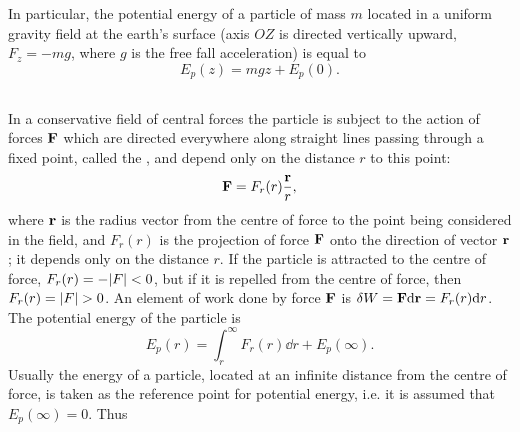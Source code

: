 In particular, the potential energy of a particle of mass $m$ lo­cated in a uniform gravity field at the earth's surface (axis $OZ$ is directed vertically upward, $F_{z} = -mg$, where $g$ is the free fall acceleration) is equal to
\begin{equation*}%
E_{p}(z) = mgz + E_{p}(0).
\end{equation*}

\subsection{}\label{3.3.4}    In a conservative field of central forces the particle is sub­ject to the action of forces $\vb{F}$ which are directed everywhere along straight lines passing through a fixed point, called the , and depend only on the distance $r$ to this point:
\begin{equation*}%
\vb{F} = F_{r}(r) \frac{\vb{r}}{r},
\end{equation*}
where $\vb{r}$ is the radius vector from the centre of force to the point being considered in the field, and $F_{r}(r)$ is the projection of force $\vb{F}$ onto the direction of vector $\vb{r}$; it depends only on the distance $r$. If the particle is attracted to the centre of force, $F_{r} (r) = -\abs{F} < 0$, but if it is repelled from the centre of force, then $F_{r} (r) = \abs{F} > 0$. An element of work done by force $\vb{F}$ is $\delta W = \vb{F} \dd \vb{r} = F_{r}(r) \dd r$.
The potential energy of the particle is 
\begin{equation*}%
E_{p}(r) = \int_{r}^{\infty} F_{r} (r) \dd r + E_{p} (\infty).
\end{equation*}
Usually the energy of a particle, located at an infinite distance from the centre of force, is taken as the reference point for po­tential energy, i.e. it is as­sumed that $E_{p} (\infty) = 0$. Thus 
